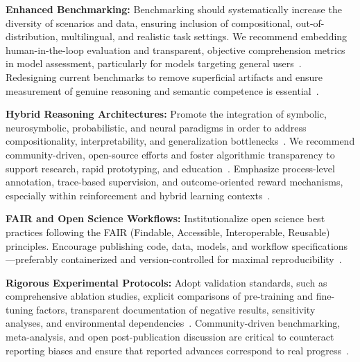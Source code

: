 \documentclass[sigconf]{acmart}
\begin{document}
\textbf{Enhanced Benchmarking:}
Benchmarking should systematically increase the diversity of scenarios and data, ensuring inclusion of compositional, out-of-distribution, multilingual, and realistic task settings. We recommend embedding human-in-the-loop evaluation and transparent, objective comprehension metrics in model assessment, particularly for models targeting general users~\cite{ref10,ref17,ref34,ref37,ref44,ref70,ref77,ref78,ref79,ref80,ref81,ref82,ref83,ref84,ref85,ref94,ref104,ref105}. Redesigning current benchmarks to remove superficial artifacts and ensure measurement of genuine reasoning and semantic competence is essential~\cite{ref44,ref77,ref78,ref98,ref99,ref102}.

\textbf{Hybrid Reasoning Architectures:}
Promote the integration of symbolic, neurosymbolic, probabilistic, and neural paradigms in order to address compositionality, interpretability, and generalization bottlenecks~\cite{ref36,ref37,ref38,ref43,ref48,ref54,ref55,ref61,ref62,ref63,ref64,ref65,ref66,ref88}. We recommend community-driven, open-source efforts and foster algorithmic transparency to support research, rapid prototyping, and education~\cite{ref38,ref46,ref48,ref54,ref86,ref87,ref92,ref93}. Emphasize process-level annotation, trace-based supervision, and outcome-oriented reward mechanisms, especially within reinforcement and hybrid learning contexts~\cite{ref38,ref46,ref48,ref54,ref65,ref87,ref92,ref93,ref97}.

\textbf{FAIR and Open Science Workflows:}
Institutionalize open science best practices following the FAIR (Findable, Accessible, Interoperable, Reusable) principles. Encourage publishing code, data, models, and workflow specifications---preferably containerized and version-controlled for maximal reproducibility~\cite{ref21,ref22,ref23,ref55,ref59,ref61,ref66,ref67,ref68,ref69,ref70,ref71,ref85,ref90,ref91,ref94,ref100,ref101,ref104,ref106,ref107,ref108}.

\textbf{Rigorous Experimental Protocols:}
Adopt validation standards, such as comprehensive ablation studies, explicit comparisons of pre-training and fine-tuning factors, transparent documentation of negative results, sensitivity analyses, and environmental dependencies~\cite{ref9,ref10,ref55,ref59,ref61,ref62,ref66,ref74,ref90,ref104,ref105,ref106,ref107,ref108}. Community-driven benchmarking, meta-analysis, and open post-publication discussion are critical to counteract reporting biases and ensure that reported advances correspond to real progress~\cite{ref22,ref45,ref55,ref61,ref88,ref101,ref106,ref107,ref108}.
\end{document}
